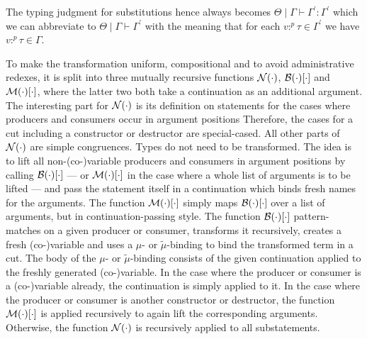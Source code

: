 \noindent The typing judgment for substitutions hence always becomes $\Theta \mid \Gamma \vdash \Gamma^{\prime} : \Gamma^{\prime}$ which we can abbreviate to $\Theta \mid \Gamma \vdash \Gamma^{\prime}$ with the meaning that for each $v :^{p} \tau \in \Gamma^{\prime}$ we have $v :^{p} \tau \in \Gamma$.

To make the transformation uniform, compositional and to avoid administrative redexes, it is split into three mutually recursive functions $\mathcal{N}(\cdot)$, $\mathcal{B}(\cdot)[\cdot]$ and $\mathcal{M}(\cdot)[\cdot]$, where the latter two both take a continuation as an additional argument.
The interesting part for $\mathcal{N}(\cdot)$ is its definition on statements for the cases where producers and consumers occur in argument positions
Therefore, the cases for a cut including a constructor or destructor are special-cased.
All other parts of $\mathcal{N}(\cdot)$ are simple congruences.
Types do not need to be transformed.
The idea is to lift all non-(co-)variable producers and consumers in argument positions by calling $\mathcal{B}(\cdot)[\cdot]$ --- or $\mathcal{M}(\cdot)[\cdot]$ in the case where a whole list of arguments is to be lifted --- and pass the statement itself in a continuation which binds fresh names for the arguments.
The function $\mathcal{M}(\cdot)[\cdot]$ simply maps $\mathcal{B}(\cdot)[\cdot]$ over a list of arguments, but in continuation-passing style.
The function $\mathcal{B}(\cdot)[\cdot]$ pattern-matches on a given producer or consumer, transforms it recursively, creates a fresh (co-)variable and uses a $\mu$- or $\tilde\mu$-binding to bind the transformed term in a cut.
The body of the $\mu$- or $\tilde\mu$-binding consists of the given continuation applied to the freshly generated (co-)variable.
In the case where the producer or consumer is a (co-)variable already, the continuation is simply applied to it.
In the case where the producer or consumer is another constructor or destructor, the function $\mathcal{M}(\cdot)[\cdot]$ is applied recursively to again lift the corresponding arguments.
Otherwise, the function $\mathcal{N}(\cdot)$ is recursively applied to all substatements.

